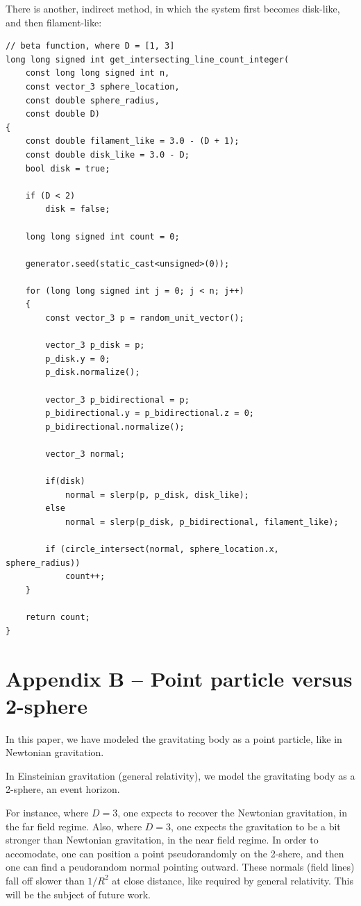 \documentclass[12pt]{article}
\begin{document}
There is another, indirect method, in which the system first becomes disk-like, and then filament-like:
\begin{lstlisting}
// beta function, where D = [1, 3]
long long signed int get_intersecting_line_count_integer(
	const long long signed int n,
	const vector_3 sphere_location,
	const double sphere_radius,
	const double D)
{
	const double filament_like = 3.0 - (D + 1);
	const double disk_like = 3.0 - D;
	bool disk = true;

	if (D < 2)
		disk = false;

	long long signed int count = 0;

	generator.seed(static_cast<unsigned>(0));

	for (long long signed int j = 0; j < n; j++)
	{
		const vector_3 p = random_unit_vector();

		vector_3 p_disk = p;
		p_disk.y = 0;
		p_disk.normalize();

		vector_3 p_bidirectional = p;
		p_bidirectional.y = p_bidirectional.z = 0;
		p_bidirectional.normalize();

		vector_3 normal;
		
		if(disk)
			normal = slerp(p, p_disk, disk_like);
		else
			normal = slerp(p_disk, p_bidirectional, filament_like);

		if (circle_intersect(normal, sphere_location.x, sphere_radius))
			count++;
	}

	return count;
}
\end{lstlisting}



\section{Appendix B -- Point particle versus 2-sphere}
In this paper, we have modeled the gravitating body as a point particle, like in Newtonian gravitation.

In Einsteinian gravitation (general relativity), we model the gravitating body as a 2-sphere, an event horizon.

For instance, where $D= 3$, one expects to recover the Newtonian gravitation, in the far field regime.
Also, where $D= 3$, one expects the gravitation to be a bit stronger than Newtonian gravitation, in the near field regime.
In order to accomodate, one can position a point pseudorandomly on the 2-shere, and then one can find a peudorandom normal pointing outward.
These normals (field lines) fall off slower than $1/R^2$ at close distance, like required by general relativity.
This will be the subject of future work.
\end{document}
